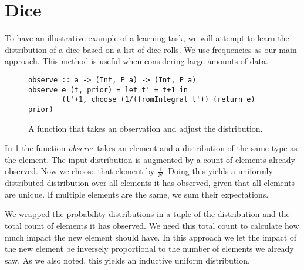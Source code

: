 \section{Dice}
To have an illustrative example of a learning task, we will attempt to learn the
distribution of a dice based on a list of dice rolls. We use frequencies as our
main approach. This method is useful when considering large amounts of data.

\begin{figure}
\begin{verbatim}
observe :: a -> (Int, P a) -> (Int, P a)
observe e (t, prior) = let t' = t+1 in
        (t'+1, choose (1/(fromIntegral t')) (return e) prior)
\end{verbatim}
\caption{A function that takes an observation and adjust the distribution.}
\label{code:dice}
\end{figure}

In \ref{code:dice} the function \emph{observe} takes an element and a distribution
of the same type as the element. The input distribution is augmented by a count
of elements already observed. Now we choose that element by $\frac{1}{N}$.
Doing this yields a uniformly distributed distribution over all elements it
has observed, given that all elements are unique. If multiple elements are the
same, we sum their expectations.

We wrapped the probability distributions in a tuple of the distribution and the
total count of elements it has observed. We need this total count to calculate
how much impact the new element should have. In this approach we let the impact
of the new element be inversely proportional to the number of elements we already
saw. As we also noted, this yields an inductive uniform distribution.